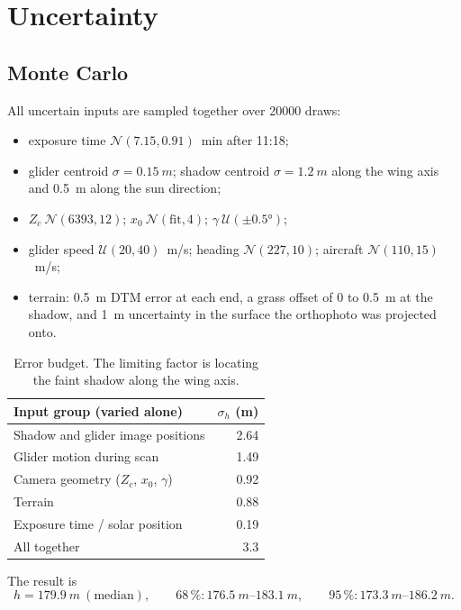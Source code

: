 \documentclass[11pt,a4paper]{article}
\begin{document}
\section{Uncertainty}\label{sec:uncertainty}

\subsection{Monte Carlo}

All uncertain inputs are sampled together over \num{20000} draws:
\begin{itemize}
  \item exposure time $\mathcal N(7.15, 0.91)$~min after 11:18;
  \item glider centroid $\sigma=\SI{0.15}{m}$; shadow centroid $\sigma=\SI{1.2}{m}$ along the wing axis
        and \SI{0.5}{m} along the sun direction;
  \item $Z_c\ \mathcal N(6393, 12)$; $x_0\ \mathcal N(\text{fit}, 4)$; $\gamma\ \mathcal U(\pm\ang{0.5})$;
  \item glider speed $\mathcal U(20, 40)$~m/s; heading $\mathcal N(227, 10)$; aircraft $\mathcal N(110, 15)$~m/s;
  \item terrain: \SI{0.5}{m} DTM error at each end, a grass offset of 0 to \SI{0.5}{m} at the shadow, and
        \SI{1}{m} uncertainty in the surface the orthophoto was projected onto.
\end{itemize}

\begin{table}[ht]
\centering
\begin{tabular}{@{}lr@{}}
\toprule
Input group (varied alone) & $\sigma_h$ (m) \\
\midrule
Shadow and glider image positions & 2.64 \\
Glider motion during scan & 1.49 \\
Camera geometry ($Z_c$, $x_0$, $\gamma$) & 0.92 \\
Terrain & 0.88 \\
Exposure time / solar position & 0.19 \\
\midrule
All together & 3.3 \\
\bottomrule
\end{tabular}
\caption{Error budget. The limiting factor is locating the faint shadow along the wing axis.}
\label{tab:budget}
\end{table}

\noindent The result is
\[
  h = \SI{179.9}{m}\ (\text{median}),\qquad 68\,\%: \SIrange{176.5}{183.1}{m},\qquad
  95\,\%: \SIrange{173.3}{186.2}{m}.
\]
\end{document}
